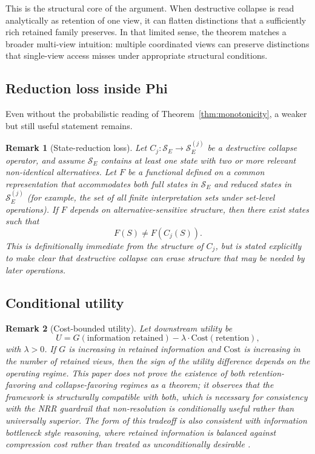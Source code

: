\documentclass[11pt,a4paper]{article}
\newtheorem{remark}{Remark}
\begin{document}
This is the structural core of the argument. When destructive collapse is read analytically as retention of one view, it can flatten distinctions that a sufficiently rich retained family preserves. In that limited sense, the theorem matches a broader multi-view intuition: multiple coordinated views can preserve distinctions that single-view access misses under appropriate structural conditions.

\subsection{Reduction loss inside Phi}

Even without the probabilistic reading of Theorem~\ref{thm:monotonicity}, a weaker but still useful statement remains.

\begin{remark}[State-reduction loss]
\label{rem:reduction}
Let $C_j : \mathcal{S}_E \to \mathcal{S}_E^{(j)}$ be a destructive collapse operator, and assume $\mathcal{S}_E$ contains at least one state with two or more relevant non-identical alternatives. Let $F$ be a functional defined on a common representation that accommodates both full states in $\mathcal{S}_E$ and reduced states in $\mathcal{S}_E^{(j)}$ (for example, the set of all finite interpretation sets under set-level operations). If $F$ depends on alternative-sensitive structure, then there exist states such that
\begin{equation}
F(S) \neq F(C_j(S)).
\end{equation}
This is definitionally immediate from the structure of $C_j$, but is stated explicitly to make clear that destructive collapse can erase structure that may be needed by later operations.
\end{remark}

\subsection{Conditional utility}

\begin{remark}[Cost-bounded utility]
\label{rem:utility}
Let downstream utility be
\begin{equation}
U = G(\text{information retained}) - \lambda \cdot \text{Cost}(\text{retention}),
\end{equation}
with $\lambda > 0$. If $G$ is increasing in retained information and $\text{Cost}$ is increasing in the number of retained views, then the sign of the utility difference depends on the operating regime. This paper does not prove the existence of both retention-favoring and collapse-favoring regimes as a theorem; it observes that the framework is structurally compatible with both, which is necessary for consistency with the NRR guardrail that non-resolution is conditionally useful rather than universally superior. The form of this tradeoff is also consistent with information bottleneck style reasoning, where retained information is balanced against compression cost rather than treated as unconditionally desirable \cite{tishby1999information}.
\end{remark}
\end{document}
